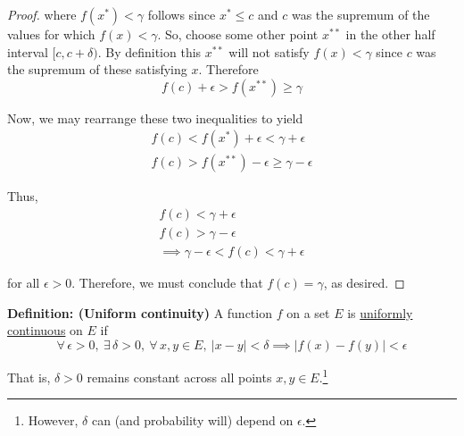 \documentclass[12pt]{article}
\begin{document}
\begin{proof}
where $f(x^*) < \gamma$ follows since $x^* \leq c$ and $c$ was the supremum of the values for which $f(x) < \gamma$. So, choose some other point $x^{**}$ in the other half interval $[c, c + \delta)$. By definition this $x^{**}$ will not satisfy $f(x) < \gamma$ since $c$ was the supremum of these satisfying $x$. Therefore
\begin{equation*}
	f(c) + \epsilon > f(x^{**}) \geq \gamma
\end{equation*}

Now, we may rearrange these two inequalities to yield
\begin{align*}
	f(c) < f(x^*) + \epsilon < \gamma + \epsilon \\
	f(c) > f(x^{**}) - \epsilon \geq \gamma - \epsilon
\end{align*}

Thus,
\begin{align*}
	f(c) < \gamma + \epsilon \\
	f(c) > \gamma - \epsilon \\
	\implies \gamma - \epsilon < f(c) < \gamma + \epsilon
\end{align*}

for all $\epsilon > 0$. Therefore, we must conclude that $f(c) = \gamma$, as desired.
\end{proof}

%
%
{\bf Definition: (Uniform continuity)} A function $f$ on a set $E$ is \underline{uniformly continuous} on $E$ if
\begin{equation*}
	\forall\,\epsilon > 0,~\exists\,\delta > 0,~\forall\,x,y\in E,~|x - y| < \delta \implies |f(x) - f(y)| < \epsilon
\end{equation*}

That is, $\delta > 0$ remains constant across all points $x, y \in E$.\footnote{However, $\delta$ can (and probability will) depend on $\epsilon$.}
\end{document}
